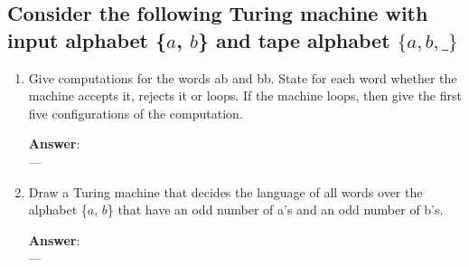 \documentclass[a4paper, 14pt]{report}
\newcommand{\answer}[1]{%
	\textbf{Answer}:\\
	#1}
\newcommand{\question}[1]{\subsection*{#1}}
\begin{document}
\question{Consider the following Turing machine with input alphabet \{$a$, $b$\} and tape alphabet $\{a, b, \_\}$}


\begin{enumerate}[label=(\alph*)]

		\setlength\itemsep{2em}

	\item Give computations for the words ab and bb. State for each word whether the
		machine accepts it, rejects it or loops. If the machine loops, then give the first
		five configurations of the computation.

		\answer{%
			---
		}

	\item Draw a Turing machine that decides the language of all words over the alphabet \{$a$, $b$\} that have an odd number of a’s and an odd number of b’s.

		\answer{%
			---
		}

\end{enumerate}		

\pagebreak


\end{document}

